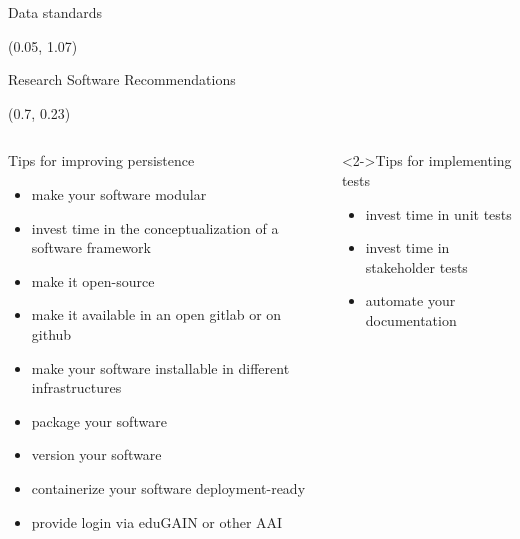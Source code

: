 \begin{frame}{Data standards}
    \begin{textblock*}{\textwidth}(0.05\linewidth, 1.07\textheight)
		\slidebuttons
	\end{textblock*}

\end{frame}

\begin{frame}{Research Software Recommendations}

    \begin{textblock*}{0.35\linewidth}(0.7\linewidth, 0.23\textheight)
        \slidebuttons
    \end{textblock*}

    \begin{columns}[t]
        \begin{column}{0.5\textwidth}
            \begin{block}{Tips for improving persistence}
                \begin{itemize}
                    \item make your software modular
                    \item invest time in the conceptualization of a software
                        framework
                    \item make it open-source
                    \item make it available in an open gitlab or on github
                    \item make your software installable in different infrastructures
                    \item package your software
                    \item version your software
                    \item containerize your software deployment-ready
                    \item provide login via eduGAIN or other AAI
                \end{itemize}
            \end{block}
        \end{column}
        \begin{column}{0.5\textwidth}
            \begin{block}<2->{Tips for implementing tests}
                \begin{itemize}
                    \item invest time in unit tests
                    \item invest time in stakeholder tests
                    \item automate your documentation

\end{itemize}
\end{block}
\end{column}
\end{columns}
\end{frame}
